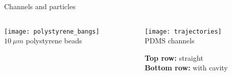 

\begin{frame}[c]{Channels and particles}

	\begin{columns}[t]
		\begin{column}[T]{2.25in}
			{\centering 
				\texttt{[image: polystyrene\_bangs]} \\
				$\SI{10}{\mu m}$ polystyrene beads \\
				\par
			}		 
		\end{column}
		
		\begin{column}[T]{2.25in}
			{\centering 
				\texttt{[image: trajectories]} \\
				PDMS channels \\
				{\footnotesize
					\textbf{Top row:} straight \\
					\textbf{Bottom row:} with cavity \\
					\par
				}
			}		 
		\end{column}
	\end{columns}	

\end{frame}





